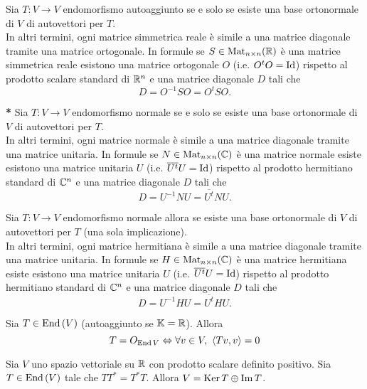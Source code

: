 \begin{thm}[Spettrale $ \K = \R $]
	Sia $ T \colon V \to V $ endomorfismo autoaggiunto se e solo se esiste una base ortonormale di $ V $ di autovettori per $ T $. \\
	In altri termini, ogni matrice simmetrica reale è simile a una matrice diagonale tramite una matrice ortogonale. In formule se $ S \in \mathrm{Mat}_{n \times n}(\mathbb{R}) $ è una matrice simmetrica reale esistono una matrice ortogonale $ O $ (i.e. $ O^{t} O = \mathrm{Id} $) rispetto al prodotto scalare standard di $ \mathbb{R}^{n} $ e una matrice diagonale $ D $ tali che \[D = O^{-1} S O = O^{t} S O.\]
\end{thm}

\begin{thm}[Spettrale $ \K = \C $] \textbf{*}
	Sia $ T \colon V \to V $ endomorfismo normale se e solo se esiste una base ortonormale di $ V $ di autovettori per $ T $.\\
	In altri termini, ogni matrice normale è simile a una matrice diagonale tramite una matrice unitaria. In formule se $ N \in \mathrm{Mat}_{n \times n}(\mathbb{C}) $ è una matrice normale esiste esistono una matrice unitaria $ U $ (i.e. $ \overline{U^t} U = \mathrm{Id} $) rispetto al prodotto hermitiano standard di $ \mathbb{C}^{n} $ e una matrice diagonale $ D $ tali che \[D = U^{-1} N U = \overline{U^t} N U.\]
\end{thm}

\begin{thm}[Spettrale $ \K = \C $ per endomorfismi autoaggiunti]
	Sia $ T \colon V \to V $ endomorfismo normale allora se esiste una base ortonormale di $ V $ di autovettori per $ T $ (una sola implicazione).\\
	In altri termini, ogni matrice hermitiana è simile a una matrice diagonale tramite una matrice unitaria. In formule se $ H \in \mathrm{Mat}_{n \times n}(\mathbb{C}) $ è una matrice hermitiana esiste esistono una matrice unitaria $ U $ (i.e. $ \overline{U^t} U = \mathrm{Id} $) rispetto al prodotto hermitiano standard di $ \mathbb{C}^{n} $ e una matrice diagonale $ D $ tali che \[D = U^{-1} H U = \overline{U^t} H U.\]
\end{thm}

\begin{prop}
	Sia $ T \in \operatorname{End}{(V)} $ (autoaggiunto se $ \K = \R $). Allora \[T = O_{\End{V}} \iff \forall v \in V, \ \scprd{Tv}{v} = 0\]
\end{prop}

\begin{thm}
	Sia $ V $ uno spazio vettoriale su $ \mathbb{R} $ con prodotto scalare definito positivo. Sia $ T \in \operatorname{End}{(V)} $ tale che $ T T^{*} = T^{*} T $. Allora $ V = \operatorname{Ker}{T} \oplus \operatorname{Im}{T} $. 
\end{thm}

